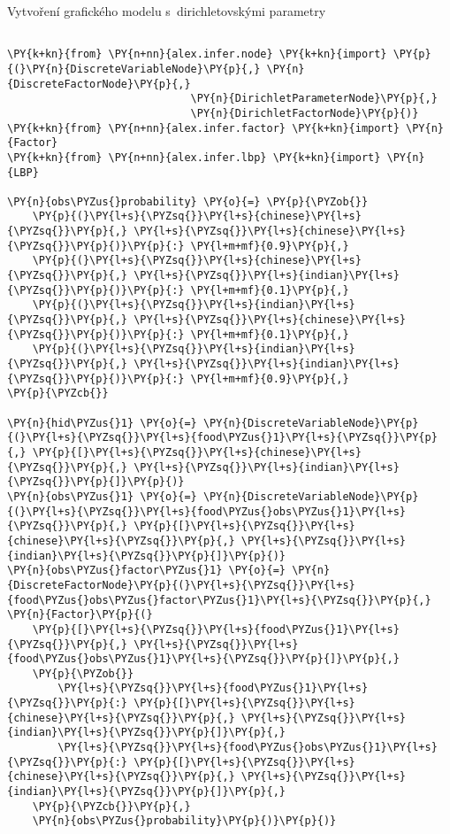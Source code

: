 \begin{example}
\caption{Vytvoření grafického modelu s~dirichletovskými parametry}
\label{lst:crtep}
\begin{Verbatim}[commandchars=\\\{\}, fontsize=\relsize{-1}]

\PY{k+kn}{from} \PY{n+nn}{alex.infer.node} \PY{k+kn}{import} \PY{p}{(}\PY{n}{DiscreteVariableNode}\PY{p}{,} \PY{n}{DiscreteFactorNode}\PY{p}{,}
                             \PY{n}{DirichletParameterNode}\PY{p}{,}
                             \PY{n}{DirichletFactorNode}\PY{p}{)}
\PY{k+kn}{from} \PY{n+nn}{alex.infer.factor} \PY{k+kn}{import} \PY{n}{Factor}
\PY{k+kn}{from} \PY{n+nn}{alex.infer.lbp} \PY{k+kn}{import} \PY{n}{LBP}

\PY{n}{obs\PYZus{}probability} \PY{o}{=} \PY{p}{\PYZob{}}
    \PY{p}{(}\PY{l+s}{\PYZsq{}}\PY{l+s}{chinese}\PY{l+s}{\PYZsq{}}\PY{p}{,} \PY{l+s}{\PYZsq{}}\PY{l+s}{chinese}\PY{l+s}{\PYZsq{}}\PY{p}{)}\PY{p}{:} \PY{l+m+mf}{0.9}\PY{p}{,}
    \PY{p}{(}\PY{l+s}{\PYZsq{}}\PY{l+s}{chinese}\PY{l+s}{\PYZsq{}}\PY{p}{,} \PY{l+s}{\PYZsq{}}\PY{l+s}{indian}\PY{l+s}{\PYZsq{}}\PY{p}{)}\PY{p}{:} \PY{l+m+mf}{0.1}\PY{p}{,}
    \PY{p}{(}\PY{l+s}{\PYZsq{}}\PY{l+s}{indian}\PY{l+s}{\PYZsq{}}\PY{p}{,} \PY{l+s}{\PYZsq{}}\PY{l+s}{chinese}\PY{l+s}{\PYZsq{}}\PY{p}{)}\PY{p}{:} \PY{l+m+mf}{0.1}\PY{p}{,}
    \PY{p}{(}\PY{l+s}{\PYZsq{}}\PY{l+s}{indian}\PY{l+s}{\PYZsq{}}\PY{p}{,} \PY{l+s}{\PYZsq{}}\PY{l+s}{indian}\PY{l+s}{\PYZsq{}}\PY{p}{)}\PY{p}{:} \PY{l+m+mf}{0.9}\PY{p}{,}
\PY{p}{\PYZcb{}}

\PY{n}{hid\PYZus{}1} \PY{o}{=} \PY{n}{DiscreteVariableNode}\PY{p}{(}\PY{l+s}{\PYZsq{}}\PY{l+s}{food\PYZus{}1}\PY{l+s}{\PYZsq{}}\PY{p}{,} \PY{p}{[}\PY{l+s}{\PYZsq{}}\PY{l+s}{chinese}\PY{l+s}{\PYZsq{}}\PY{p}{,} \PY{l+s}{\PYZsq{}}\PY{l+s}{indian}\PY{l+s}{\PYZsq{}}\PY{p}{]}\PY{p}{)}
\PY{n}{obs\PYZus{}1} \PY{o}{=} \PY{n}{DiscreteVariableNode}\PY{p}{(}\PY{l+s}{\PYZsq{}}\PY{l+s}{food\PYZus{}obs\PYZus{}1}\PY{l+s}{\PYZsq{}}\PY{p}{,} \PY{p}{[}\PY{l+s}{\PYZsq{}}\PY{l+s}{chinese}\PY{l+s}{\PYZsq{}}\PY{p}{,} \PY{l+s}{\PYZsq{}}\PY{l+s}{indian}\PY{l+s}{\PYZsq{}}\PY{p}{]}\PY{p}{)}
\PY{n}{obs\PYZus{}factor\PYZus{}1} \PY{o}{=} \PY{n}{DiscreteFactorNode}\PY{p}{(}\PY{l+s}{\PYZsq{}}\PY{l+s}{food\PYZus{}obs\PYZus{}factor\PYZus{}1}\PY{l+s}{\PYZsq{}}\PY{p}{,} \PY{n}{Factor}\PY{p}{(}
    \PY{p}{[}\PY{l+s}{\PYZsq{}}\PY{l+s}{food\PYZus{}1}\PY{l+s}{\PYZsq{}}\PY{p}{,} \PY{l+s}{\PYZsq{}}\PY{l+s}{food\PYZus{}obs\PYZus{}1}\PY{l+s}{\PYZsq{}}\PY{p}{]}\PY{p}{,}
    \PY{p}{\PYZob{}}
        \PY{l+s}{\PYZsq{}}\PY{l+s}{food\PYZus{}1}\PY{l+s}{\PYZsq{}}\PY{p}{:} \PY{p}{[}\PY{l+s}{\PYZsq{}}\PY{l+s}{chinese}\PY{l+s}{\PYZsq{}}\PY{p}{,} \PY{l+s}{\PYZsq{}}\PY{l+s}{indian}\PY{l+s}{\PYZsq{}}\PY{p}{]}\PY{p}{,}
        \PY{l+s}{\PYZsq{}}\PY{l+s}{food\PYZus{}obs\PYZus{}1}\PY{l+s}{\PYZsq{}}\PY{p}{:} \PY{p}{[}\PY{l+s}{\PYZsq{}}\PY{l+s}{chinese}\PY{l+s}{\PYZsq{}}\PY{p}{,} \PY{l+s}{\PYZsq{}}\PY{l+s}{indian}\PY{l+s}{\PYZsq{}}\PY{p}{]}\PY{p}{,}
    \PY{p}{\PYZcb{}}\PY{p}{,}
    \PY{n}{obs\PYZus{}probability}\PY{p}{)}\PY{p}{)}


\end{Verbatim}
\end{example}
